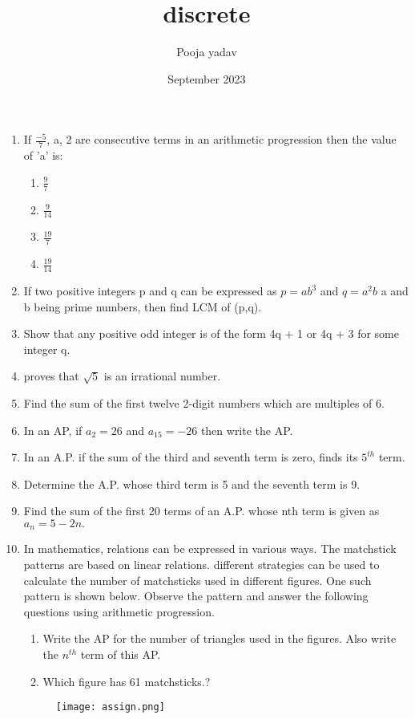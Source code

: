 \documentclass{article}
\title{discrete}
\author{Pooja yadav}
\date{September 2023}
\begin{document}
\maketitle

\begin{enumerate}
    



\item If   \(\frac{-5}{7}\), a, 2 are consecutive terms in an arithmetic progression then the value of 'a' is:
   \begin{enumerate}
    
    \item \(\frac{9}{7}\)
    \item \(\frac{9}{14}\)
    \item \(\frac{19}{7}\)
    \item \(\frac{19}{14}\)
\end{enumerate}

 \item If two positive integers p and q can be expressed as $p = ab^3$ and $q = a^2b$ a and b being prime numbers, then find LCM of (p,q).

\item Show that any positive odd integer is of the form 4q + 1 or 4q + 3 for some integer q.
\item proves that $\sqrt{5}$ is an irrational number.
\item Find the sum of the first twelve 2-digit numbers which are multiples of 6.   
    
\item In an AP, if $a_2 = 26$ and $a_{15} = -26$ then write the AP. 
 \item In an A.P. if the sum of the third and seventh term is zero, finds its $5^{th}$
    term.
\item Determine the A.P. whose third term is 5 and the seventh term is 9.
\item Find the sum of the first 20 terms of an A.P. whose nth term is given as $a_n= 5 - 2n.$
\item In mathematics, relations can be expressed in various ways. The matchstick patterns are based on linear relations. different strategies can be used to calculate the number of matchsticks used in different figures.
 One such pattern is shown below. Observe the pattern and answer the following questions using arithmetic progression.
  

\begin{enumerate}
\item Write the AP for the number of triangles used in the figures. Also
write the $n^{th}$ term of this AP.
\item Which figure has 61 matchsticks.? 
\end{enumerate}
\begin{figure}
\centering
\texttt{[image: assign.png]}
\caption{}
\end{figure} 




\end{enumerate}
\end{document}
